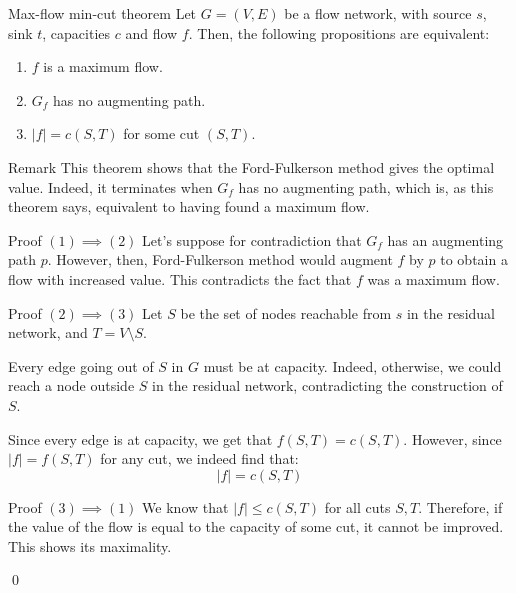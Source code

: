 \documentclass[a4paper]{article}
\begin{document}
\begin{parag}{Max-flow min-cut theorem}
    Let $G = \left(V, E\right)$ be a flow network, with source $s$, sink $t$, capacities $c$ and flow $f$. Then, the following propositions are equivalent:
    \begin{enumerate}
        \item $f$ is a maximum flow.
        \item $G_f$ has no augmenting path.
        \item $\left|f\right| = c\left(S, T\right)$ for some cut $\left(S, T\right)$.
    \end{enumerate}
    
    \begin{subparag}{Remark}
        This theorem shows that the Ford-Fulkerson method gives the optimal value. Indeed, it terminates when $G_f$ has no augmenting path, which is, as this theorem says, equivalent to having found a maximum flow.
    \end{subparag}

    \begin{subparag}{Proof $\left(1\right) \implies \left(2\right)$}
        Let's suppose for contradiction that $G_f$ has an augmenting path $p$. However, then, Ford-Fulkerson method would augment $f$ by $p$ to obtain a flow with increased value. This contradicts the fact that $f$ was a maximum flow.
    \end{subparag}
    
    \begin{subparag}{Proof $\left(2\right) \implies \left(3\right)$}
        Let $S$ be the set of nodes reachable from $s$ in the residual network, and $T = V \setminus S$. 

        Every edge going out of $S$ in $G$ must be at capacity. Indeed, otherwise, we could reach a node outside $S$ in the residual network, contradicting the construction of $S$.

        Since every edge is at capacity, we get that $f\left(S, T\right) = c\left(S, T\right)$. However, since $\left|f\right| = f\left(S, T\right)$ for any cut, we indeed find that: 
        \[\left|f\right| = c\left(S, T\right)\]
    \end{subparag}

    \begin{subparag}{Proof $\left(3\right) \implies \left(1\right)$}
        We know that $\left|f\right| \leq c\left(S, T\right)$ for all cuts $S, T$. Therefore, if the value of the flow is equal to the capacity of some cut, it cannot be improved. This shows its maximality.

        \qed
    \end{subparag}
\end{parag}
\end{document}
